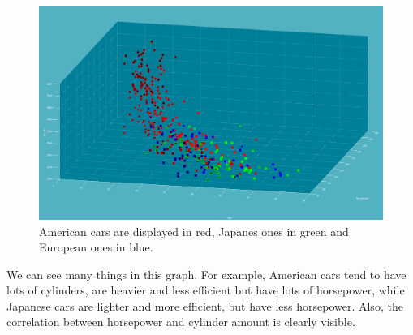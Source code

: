 \documentclass{article}
\begin{document}
\begin{figure}
	\includegraphics{scivis_plot}
	\caption{American cars are displayed in red, Japanes ones in green and
	European ones in blue.}
\end{figure}

We can see many things in this graph. For example, American cars tend to have
lots of cylinders, are heavier and less efficient but have lots of horsepower,
while Japanese cars are lighter and more efficient, but have less horsepower.
Also, the correlation between horsepower and cylinder amount is clearly
visible.
\end{document}
